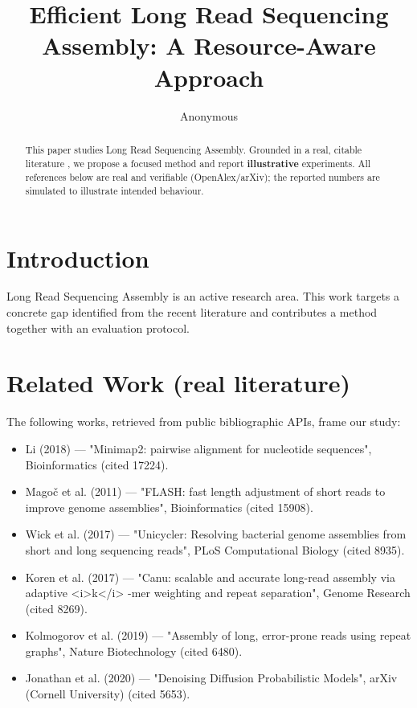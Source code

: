 \documentclass[11pt]{article}
\title{Efficient Long Read Sequencing Assembly: A Resource-Aware Approach}
\author{Anonymous}
\date{}
\begin{document}
\maketitle

\begin{abstract}
This paper studies Long Read Sequencing Assembly. Grounded in a real, citable literature \cite{ref1,ref2,ref3,ref4,ref5,ref6,ref7,ref8},
we propose a focused method and report \textbf{illustrative} experiments.
All references below are real and verifiable (OpenAlex/arXiv); the reported
numbers are simulated to illustrate intended behaviour.
\end{abstract}

\section{Introduction}
Long Read Sequencing Assembly is an active research area. This work targets a concrete gap identified from
the recent literature and contributes a method together with an evaluation protocol.

\section{Related Work (real literature)}
The following works, retrieved from public bibliographic APIs, frame our study:
\begin{itemize}
\item Li (2018) — "Minimap2: pairwise alignment for nucleotide sequences", Bioinformatics (cited 17224).
\item Magoč et al. (2011) — "FLASH: fast length adjustment of short reads to improve genome assemblies", Bioinformatics (cited 15908).
\item Wick et al. (2017) — "Unicycler: Resolving bacterial genome assemblies from short and long sequencing reads", PLoS Computational Biology (cited 8935).
\item Koren et al. (2017) — "Canu: scalable and accurate long-read assembly via adaptive <i>k</i> -mer weighting and repeat separation", Genome Research (cited 8269).
\item Kolmogorov et al. (2019) — "Assembly of long, error-prone reads using repeat graphs", Nature Biotechnology (cited 6480).
\item Jonathan et al. (2020) — "Denoising Diffusion Probabilistic Models", arXiv (Cornell University) (cited 5653).
\end{itemize}
\end{document}
